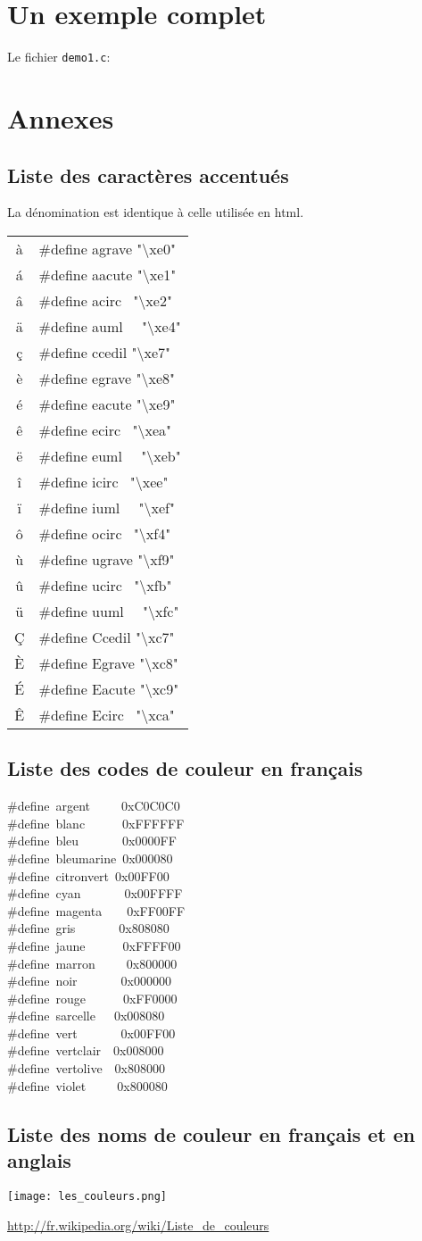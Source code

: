 \documentclass{article}
\newcommand\code[1]{
\begin{mdframed}[linecolor=purple,backgroundcolor=blue!10]
{\tt
#1
}
\end{mdframed}
}
\begin{document}
\section{Un exemple complet}
Le fichier \texttt{demo1.c}:
\code{

}

\newcommand\letac[2]{\#define #1 "\textbackslash #2"\\}
\newcommand\letacfin[2]{\#define #1 "\textbackslash #2"}

\appendix
\section{Annexes}
\subsection{Liste des caractères accentués}
La dénomination est identique à celle utilisée en html.
\code{
\begin{tabular}{|c|l|}
\hline
à   & \letac{agrave}{xe0}
\'a & \letac{aacute}{xe1}
â   & \letac{acirc~}{xe2}
ä   & \letac{auml~~}{xe4}
ç   & \letac{ccedil}{xe7}
è   & \letac{egrave}{xe8}
é   & \letac{eacute}{xe9}
ê   & \letac{ecirc~}{xea}
ë   & \letac{euml~~}{xeb}
î   & \letac{icirc~}{xee}
ï   & \letac{iuml~~}{xef}
ô   & \letac{ocirc~}{xf4}
ù   & \letac{ugrave}{xf9}
û   & \letac{ucirc~}{xfb}
ü   & \letac{uuml~~}{xfc}
\c{C} & \letac{Ccedil}{xc7}
È   & \letac{Egrave}{xc8}
\'E & \letac{Eacute}{xc9}
Ê   & \letac{Ecirc~}{xca}
\hline
\end{tabular}
}

\subsection{Liste des codes de couleur en français}
\code{
\#define~argent~~~~~0xC0C0C0\\
\#define~blanc~~~~~~0xFFFFFF\\
\#define~bleu~~~~~~~0x0000FF\\
\#define~bleumarine~0x000080\\
\#define~citronvert~0x00FF00\\
\#define~cyan~~~~~~~0x00FFFF\\
\#define~magenta~~~~0xFF00FF\\
\#define~gris~~~~~~~0x808080\\
\#define~jaune~~~~~~0xFFFF00\\
\#define~marron~~~~~0x800000\\
\#define~noir~~~~~~~0x000000\\
\#define~rouge~~~~~~0xFF0000\\
\#define~sarcelle~~~0x008080\\
\#define~vert~~~~~~~0x00FF00\\
\#define~vertclair~~0x008000\\
\#define~vertolive~~0x808000\\
\#define~violet~~~~~0x800080
}

\subsection{Liste des noms de couleur en français et en anglais}
\texttt{[image: les\_couleurs.png]}

\url{http://fr.wikipedia.org/wiki/Liste_de_couleurs}
\end{document}
